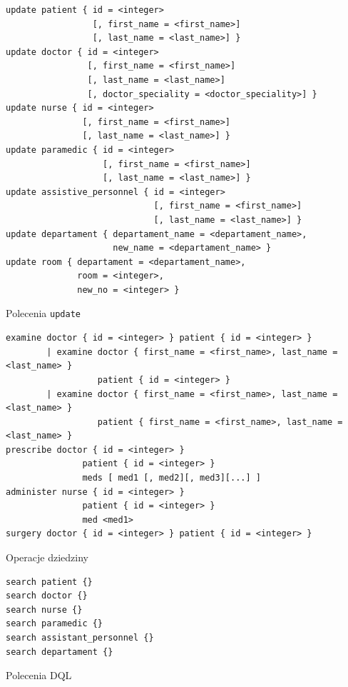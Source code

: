 \documentclass[a4paper, 10pt]{article}
\begin{document}
    \begin{listing}
        \begin{verbatim}
update patient { id = <integer>
                 [, first_name = <first_name>]
                 [, last_name = <last_name>] }
update doctor { id = <integer>
                [, first_name = <first_name>]
                [, last_name = <last_name>]
                [, doctor_speciality = <doctor_speciality>] }
update nurse { id = <integer>
               [, first_name = <first_name>]
               [, last_name = <last_name>] }
update paramedic { id = <integer>
                   [, first_name = <first_name>]
                   [, last_name = <last_name>] }
update assistive_personnel { id = <integer>
                             [, first_name = <first_name>]
                             [, last_name = <last_name>] }
update departament { departament_name = <departament_name>,
                     new_name = <departament_name> }
update room { departament = <departament_name>,
              room = <integer>,
              new_no = <integer> }
        \end{verbatim}
        \caption{Polecenia \texttt{update}}
        \label{list:update}
    \end{listing}
    \begin{listing}
        \begin{verbatim}
examine doctor { id = <integer> } patient { id = <integer> }
        | examine doctor { first_name = <first_name>, last_name = <last_name> }
                  patient { id = <integer> }
        | examine doctor { first_name = <first_name>, last_name = <last_name> }
                  patient { first_name = <first_name>, last_name = <last_name> }
prescribe doctor { id = <integer> }
               patient { id = <integer> }
               meds [ med1 [, med2][, med3][...] ]
administer nurse { id = <integer> }
               patient { id = <integer> }
               med <med1>
surgery doctor { id = <integer> } patient { id = <integer> }
        \end{verbatim}
        \caption{Operacje dziedziny}
        \label{list:domain}
    \end{listing}
    \begin{listing}
        \begin{verbatim}
search patient {}
search doctor {}
search nurse {}
search paramedic {}
search assistant_personnel {}
search departament {}
        \end{verbatim}
        \caption{Polecenia DQL}
        \label{list:DQL}
    \end{listing}
\end{document}
